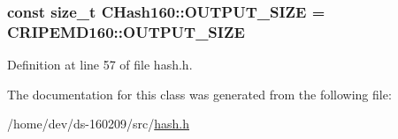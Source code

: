 \subsubsection[{O\+U\+T\+P\+U\+T\+\_\+\+S\+I\+Z\+E}]{\setlength{\rightskip}{0pt plus 5cm}const size\+\_\+t C\+Hash160\+::\+O\+U\+T\+P\+U\+T\+\_\+\+S\+I\+Z\+E = C\+R\+I\+P\+E\+M\+D160\+::\+O\+U\+T\+P\+U\+T\+\_\+\+S\+I\+Z\+E\hspace{0.3cm}{\ttfamily [static]}}\label{class_c_hash160_a1a5618e17d91ea96e86d779f575211eb}


Definition at line 57 of file hash.\+h.



The documentation for this class was generated from the following file\+:\begin{DoxyCompactItemize}
\item 
/home/dev/ds-\/160209/src/\hyperlink{hash_8h}{hash.\+h}\end{DoxyCompactItemize}
